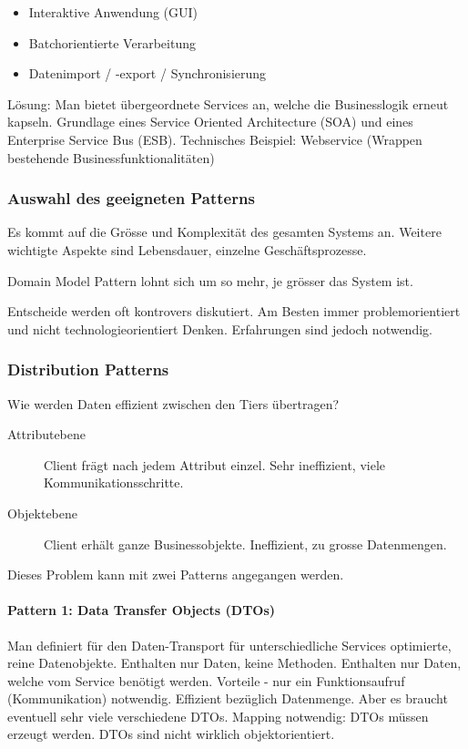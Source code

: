 \begin{itemize}
	\item Interaktive Anwendung (GUI)
	\item Batchorientierte Verarbeitung
	\item Datenimport / -export / Synchronisierung
\end{itemize}

Lösung: Man bietet übergeordnete Services an, welche die Businesslogik erneut kapseln. Grundlage eines Service Oriented Architecture (SOA) und eines Enterprise Service Bus (ESB). Technisches Beispiel: Webservice (Wrappen bestehende Businessfunktionalitäten)

\subsubsection{Auswahl des geeigneten Patterns}
Es kommt auf die Grösse und Komplexität des gesamten Systems an. Weitere wichtigte Aspekte sind Lebensdauer, einzelne Geschäftsprozesse.

Domain Model Pattern lohnt sich um so mehr, je grösser das System ist.

Entscheide werden oft kontrovers diskutiert. Am Besten immer problemorientiert und nicht technologieorientiert Denken. Erfahrungen sind jedoch notwendig.

\subsubsection{Distribution Patterns}
Wie werden Daten effizient zwischen den Tiers übertragen?

\begin{description}
	\item[Attributebene] Client frägt nach jedem Attribut einzel. Sehr ineffizient, viele Kommunikationsschritte.
	\item[Objektebene] Client erhält ganze Businessobjekte. Ineffizient, zu grosse Datenmengen.
\end{description}

Dieses Problem kann mit zwei Patterns angegangen werden.

\paragraph{Pattern 1: Data Transfer Objects (DTOs)} Man definiert für den Daten-Transport für unterschiedliche Services optimierte, reine Datenobjekte. Enthalten nur Daten, keine Methoden. Enthalten nur Daten, welche vom Service benötigt werden. Vorteile - nur ein Funktionsaufruf (Kommunikation) notwendig. Effizient bezüglich Datenmenge. Aber es braucht eventuell sehr viele verschiedene DTOs. Mapping notwendig: DTOs müssen erzeugt werden. DTOs sind nicht wirklich objektorientiert.

